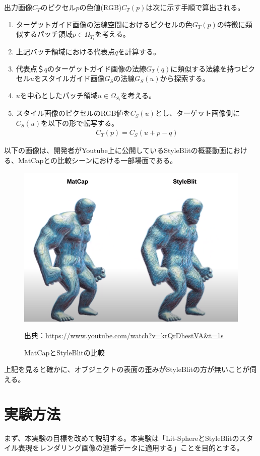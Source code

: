 \documentclass[dvipdfmx]{jsarticle}
\begin{document}
出力画像$C_{T}$のピクセル$p$の色値(RGB)$C_{T}(p)$は次に示す手順で算出される。
\begin{enumerate}
  \item ターゲットガイド画像の法線空間におけるピクセルの色$G_{T}(p)$の特徴に類似するパッチ領域$p \in \Omega_{T_{i}}$を考える。
  \item 上記バッチ領域における代表点$q$を計算する。
  \item 代表点＄$q$のターゲットガイド画像の法線$G_{T}(q)$に類似する法線を持つピクセル$u$をスタイルガイド画像$G_{S}$の法線$G_{S}(u)$から探索する。
  \item $u$を中心としたパッチ領域$u \in \Omega_{S_{i}}$を考える。
  \item スタイル画像のピクセルのRGB値を$C_{S}(u)$とし、ターゲット画像側に$C_{S}(u)$を以下の形で転写する。
  \begin{gather*}
    C_{T}(p) = C_{S}(u + p -q)
  \end{gather*}
\end{enumerate}
以下の画像は、開発者がYoutube上に公開しているStyleBlitの概要動画における、MatCapとの比較シーンにおける一部場面である。
\begin{figure}[H]
  \centering
  \includegraphics[scale=0.4]{images/styleblit_ex.png}
  \caption{MatCapとStyleBlitの比較}
  出典：\url{https://www.youtube.com/watch?v=krQrDhestVA&t=1s}
\end{figure}
上記を見ると確かに、オブジェクトの表面の歪みがStyleBlitの方が無いことが伺える。
\section{実験方法}
まず、本実験の目標を改めて説明する。本実験は「Lit-SphereとStyleBlitのスタイル表現をレンダリング画像の連番データに適用する」ことを目的とする。
\end{document}
